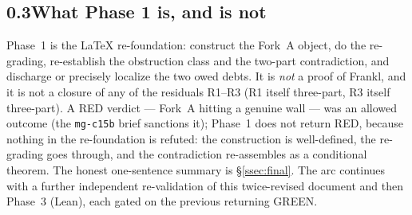 \documentclass[11pt,oneside]{amsart}
\theoremstyle{plain}
\theoremstyle{definition}
\theoremstyle{remark}
\theoremstyle{honeststyle}
\begin{document}
\subsection*{0.3\quad What Phase 1 is, and is not}

Phase~1 is the LaTeX re-foundation: construct the Fork~A object, do the
re-grading, re-establish the obstruction class and the two-part
contradiction, and discharge or precisely localize the two owed debts.
It is \emph{not} a proof of Frankl, and it is not a closure of any of
the residuals R1--R3 (R1 itself three-part, R3 itself three-part). A
RED verdict --- Fork~A hitting a genuine
wall --- was an allowed outcome (the \texttt{mg-c15b} brief sanctions
it); Phase~1 does not return RED, because nothing in the re-foundation
is refuted: the construction is well-defined, the re-grading goes
through, and the contradiction re-assembles as a conditional theorem.
The honest one-sentence summary is \S\ref{ssec:final}. The arc
continues with a further independent re-validation of this
twice-revised document and then Phase~3 (Lean), each gated on the
previous returning GREEN.
\end{document}

